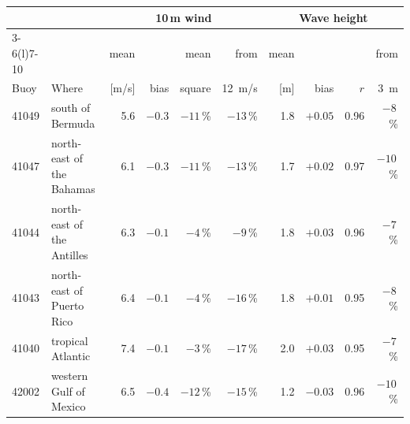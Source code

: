 \begin{tabular}{@{}llrrrrrrrr@{}}
\toprule
 & & \multicolumn{4}{c}{10\,m wind} & \multicolumn{4}{c}{Wave height} \\
\cmidrule(lr){3-6}\cmidrule(l){7-10}
 & & mean & & mean & from & mean & & & from \\
Buoy & Where & [m/s] & bias & square & \SI{12}{m/s} & [m] & bias & $r$ & \SI{3}{m} \\
\midrule
41049 & south of Bermuda & 5.6 & \(-0.3\) & \(-11\)\,\% & \(-13\)\,\% & 1.8 & \(+0.05\) & 0.96 & \(-8\)\,\% \\
41047 & north-east of the Bahamas & 6.1 & \(-0.3\) & \(-11\)\,\% & \(-13\)\,\% & 1.7 & \(+0.02\) & 0.97 & \(-10\)\,\% \\
41044 & north-east of the Antilles & 6.3 & \(-0.1\) & \(-4\)\,\% & \(-9\)\,\% & 1.8 & \(+0.03\) & 0.96 & \(-7\)\,\% \\
41043 & north-east of Puerto Rico & 6.4 & \(-0.1\) & \(-4\)\,\% & \(-16\)\,\% & 1.8 & \(+0.01\) & 0.95 & \(-8\)\,\% \\
41040 & tropical Atlantic & 7.4 & \(-0.1\) & \(-3\)\,\% & \(-17\)\,\% & 2.0 & \(+0.03\) & 0.95 & \(-7\)\,\% \\
42002 & western Gulf of Mexico & 6.5 & \(-0.4\) & \(-12\)\,\% & \(-15\)\,\% & 1.2 & \(-0.03\) & 0.96 & \(-10\)\,\% \\
\bottomrule
\end{tabular}
